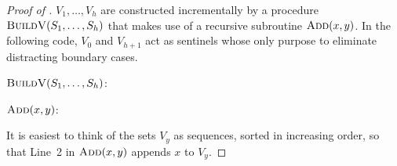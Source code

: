 \documentclass[kpfonts]{patmorin}
\newcommand{\snote}[1]{\fcolorbox{red}{yellow}{#1}}
\newcommand{\pnote}[1]{\ \newline\noindent\fcolorbox{red}{yellow}{\begin{minipage}{\textwidth}#1\end{minipage}}}
\let\ge\geqslant
\begin{document}
\begin{proof}[Proof of ]
  $V_1,\ldots,V_{h}$ are constructed incrementally by a procedure $\textsc{BuildV}(S_1,\ldots,S_h)$ that makes use of a recursive subroutine $\textsc{Add}(x, y)$.  In the following code, $V_0$ and $V_{h+1}$ act as sentinels whose only purpose to eliminate distracting boundary cases.

  \noindent$\textsc{BuildV}(S_1,\ldots,S_h)$:
  \begin{algorithmic}[1]
        \ENDIF
      \ENDFOR
    \ENDFOR
  \end{algorithmic}

  \noindent$\textsc{Add}(x, y)$:
  \begin{algorithmic}[1]
      \IF{$|V_y|\ge 4$}
        \ENDIF
      \ENDIF
    \ENDIF
  \end{algorithmic}

  It is easiest to think of the sets $V_y$ as sequences, sorted in increasing order, so that Line~2 in $\textsc{Add}(x,y)$ appends $x$ to $V_y$.


\end{proof}
\end{document}
